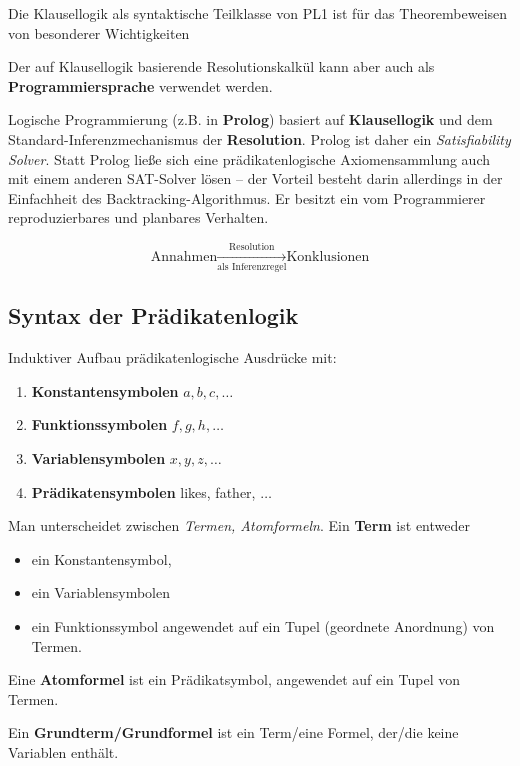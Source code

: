 \documentclass[runningheads,deutsch]{llncs}
\begin{document}
Die Klausellogik als syntaktische Teilklasse von PL1 ist für das Theorembeweisen von besonderer Wichtigkeiten

Der auf Klausellogik basierende Resolutionskalkül kann aber auch als \textbf{Programmiersprache} verwendet werden.

Logische Programmierung (z.B. in \textbf{Prolog}) basiert auf \textbf{Klausellogik} und dem Standard-Inferenzmechanismus der \textbf{Resolution}. Prolog ist daher ein \textit{Satisfiability Solver}. Statt Prolog ließe sich eine prädikatenlogische Axiomensammlung auch mit einem anderen SAT-Solver lösen -- der Vorteil besteht darin allerdings in der Einfachheit des Backtracking-Algorithmus. Er besitzt ein vom Programmierer reproduzierbares und planbares Verhalten. 

\[
    \text{Annahmen} \xrightarrow[\text{als Inferenzregel}]{\text{Resolution}} \text{Konklusionen}
\]


\subsection{Syntax der Prädikatenlogik}

Induktiver Aufbau prädikatenlogische Ausdrücke mit:

\begin{enumerate}
    \item \textbf{Konstantensymbolen} $a, b, c, \dots$
    \item \textbf{Funktionssymbolen} $f, g, h, \dots$
    \item \textbf{Variablensymbolen} $x, y, z, \dots$
    \item \textbf{Prädikatensymbolen} likes, father, $\dots$
\end{enumerate}

Man unterscheidet zwischen \textit{Termen, Atomformeln}.
Ein \textbf{Term} ist entweder

\begin{itemize}
    \item ein Konstantensymbol,
    \item ein Variablensymbolen
    \item ein Funktionssymbol angewendet auf ein Tupel (geordnete Anordnung) von Termen.
\end{itemize}

Eine \textbf{Atomformel} ist ein Prädikatsymbol, angewendet auf ein Tupel von Termen.

Ein \textbf{Grundterm/Grundformel} ist ein Term/eine Formel, der/die keine Variablen enthält.
\end{document}
